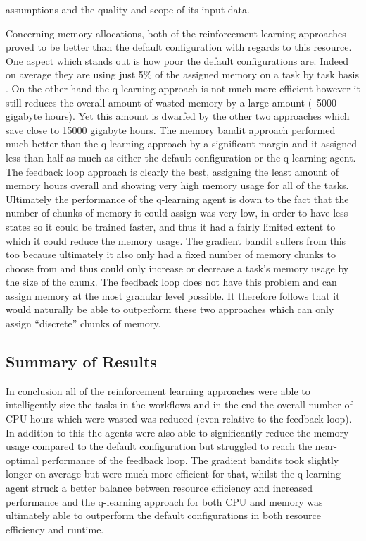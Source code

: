 assumptions and the quality and scope of its input data.

Concerning memory allocations, both of the reinforcement learning approaches proved to be better than the default configuration with regards to this resource. One aspect which stands out is how poor the default configurations are. Indeed on average they are using just 5\% of the assigned memory on a task by task basis . On the other hand the q-learning approach is not much more efficient however it still reduces the overall amount of wasted memory by a large amount (~5000 gigabyte hours). Yet this amount is dwarfed by the other two approaches which save close to 15000 gigabyte hours. The memory bandit approach performed much better than the q-learning approach by a significant margin and it assigned less than half as much as either the default configuration or the q-learning agent. The feedback loop approach is clearly the best, assigning the least amount of memory hours overall and showing very high memory usage for all of the tasks. Ultimately the performance of the q-learning agent is down to the fact that the number of chunks of memory it could assign was very low, in order to have less states so it could be trained faster, and thus it had a fairly limited extent to which it could reduce the memory usage. The gradient bandit suffers from this too because ultimately it also only had a fixed number of memory chunks to choose from and thus could only increase or decrease a task’s memory usage by the size of the chunk. The feedback loop does not have this problem and can assign memory at the most granular level possible. It therefore follows that it would naturally be able to outperform these two approaches which can only assign “discrete” chunks of memory.


\subsection{Summary of Results}
\label{sub:summary}

In conclusion all of the reinforcement learning approaches were able to intelligently size the tasks in the workflows and in the end the overall number of CPU hours which were wasted was reduced (even relative to the feedback loop). In addition to this the agents were also able to significantly reduce the memory usage compared to the default configuration but struggled to reach the near-optimal performance of the feedback loop. The gradient bandits took slightly longer on average but were much more efficient for that, whilst the q-learning agent struck a better balance between resource efficiency and increased performance and the q-learning approach for both CPU and memory was ultimately able to outperform the default configurations in both resource efficiency and runtime.


